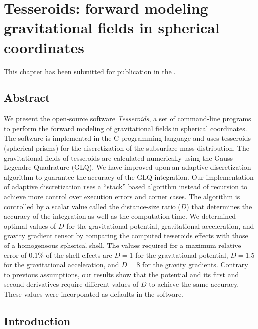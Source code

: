\chapter{Tesseroids: forward modeling gravitational fields in spherical coordinates}
\label{chap:tesseroids}


This chapter has been submitted for publication in the \DIFdelbegin {}\DIFdelend \DIFaddbegin {}\DIFaddend .

\section{Abstract}

We present the open-source software \emph{Tesseroids},
a set of command-line programs to perform the forward modeling
of gravitational fields in spherical coordinates.
The software is implemented in the C programming language and uses tesseroids
(spherical prisms) for the discretization of the subsurface mass distribution.
The gravitational fields of tesseroids are calculated numerically using
the Gauss-Legendre Quadrature (GLQ).
We have improved upon an adaptive discretization algorithm
to guarantee the accuracy of the GLQ integration.
Our implementation of adaptive discretization
uses a ``stack'' based algorithm
instead of recursion to achieve
more control over execution errors and corner cases.
The algorithm is controlled by
a scalar value called the distance-size ratio ($D$)
that determines the accuracy of the integration as well as
the computation time.
We determined optimal values of $D$
for the gravitational potential, gravitational acceleration,
and gravity gradient tensor
by comparing the computed tesseroids effects
with those of a homogeneous spherical shell.
The values required for a maximum relative error of 0.1\% of the shell effects
are $D = 1$ for the gravitational potential, $D = 1.5$ for the gravitational
acceleration, and $D = 8$ for the gravity gradients.
Contrary to previous assumptions,
our results show that the potential and its first and second derivatives
require different values of $D$ to achieve the same accuracy.
These values were incorporated as defaults in the software.


\section{Introduction}


